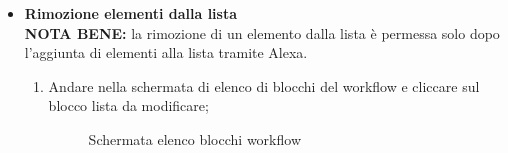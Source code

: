 \begin{itemize}
	\item \textbf{Rimozione elementi dalla lista} \\
	\textbf{NOTA BENE:} la rimozione di un elemento dalla lista è permessa solo dopo l'aggiunta di elementi alla lista tramite Alexa.
	\begin{enumerate}
		\item Andare nella schermata di elenco di blocchi del workflow e cliccare sul blocco lista da modificare;
		\begin{figure}[!ht]
			\centering
			\caption{Schermata elenco blocchi workflow}
		\end{figure}

\end{enumerate}
\end{itemize}
